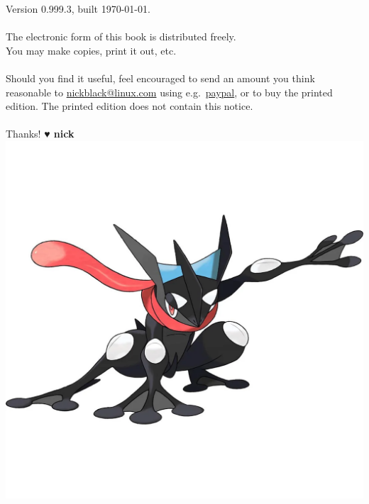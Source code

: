 \clearpage
\noindent{}Version 0.999.3, built \today.\\
\\
The electronic form of this book is distributed freely.\\
You may make copies, print it out, etc.\\
\\
Should you find it useful, feel encouraged to send an amount you think reasonable to
  \href{mailto:nickblack@linux.com}{nickblack@linux.com} using
  e.g.\ \href{https://paypal.me/dankamongmen}{paypal},
  or to buy the printed edition.
The printed edition does not contain this notice.\\
\\
Thanks! {\textbf{{\symbolfont♥} nick}}
\vfill
\includegraphics[width=\linewidth,keepaspectratio]{images/greninja.png}
